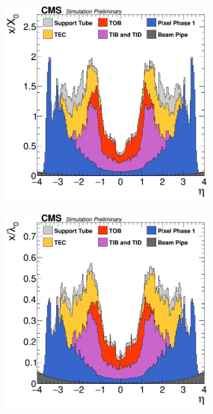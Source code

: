 \begin{figure}
    \begin{subfigure}[b]{0.5\linewidth}
    \centering
    \includegraphics[width=\linewidth]{Chapitre3/Images/MaterialBudgetTrackerPhase1_FractionRadiationLength.png} 
    \caption*{} 
    \vspace{0.5ex}
  \end{subfigure}%
  \begin{subfigure}[b]{0.5\linewidth}
    \centering
    \includegraphics[width=\linewidth]{Chapitre3/Images/MaterialBudgetTrackerPhase1_HadronicInteractionLengthFraction.png} 

\end{subfigure}
\end{figure}
